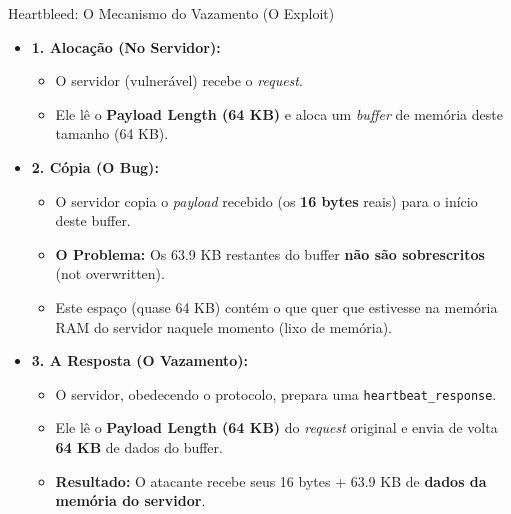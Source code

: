 \begin{frame}{Heartbleed: O Mecanismo do Vazamento (O Exploit)}
    \begin{itemize}
        \item \textbf{1. Alocação (No Servidor):}
              \begin{itemize}
                  \item O servidor (vulnerável) recebe o \textit{request}.
                  \item Ele lê o \textbf{Payload Length (64 KB)} e aloca um \textit{buffer} de memória deste tamanho (64 KB).
              \end{itemize}

        \item \textbf{2. Cópia (O Bug):}
              \begin{itemize}
                  \item O servidor copia o \textit{payload} recebido (os \textbf{16 bytes} reais) para o início deste buffer.
                  \item \textbf{O Problema:} Os 63.9 KB restantes do buffer \textbf{não são sobrescritos} (not overwritten).
                  \item Este espaço (quase 64 KB) contém o que quer que estivesse na memória RAM do servidor naquele momento (lixo de memória).
              \end{itemize}

        \item \textbf{3. A Resposta (O Vazamento):}
              \begin{itemize}
                  \item O servidor, obedecendo o protocolo, prepara uma \texttt{heartbeat\_response}.
                  \item Ele lê o \textbf{Payload Length (64 KB)} do \textit{request} original e envia de volta \textbf{64 KB} de dados do buffer.
                  \item \textbf{Resultado:} O atacante recebe seus 16 bytes + 63.9 KB de \textbf{dados da memória do servidor}.
              \end{itemize}
    \end{itemize}
\end{frame}

